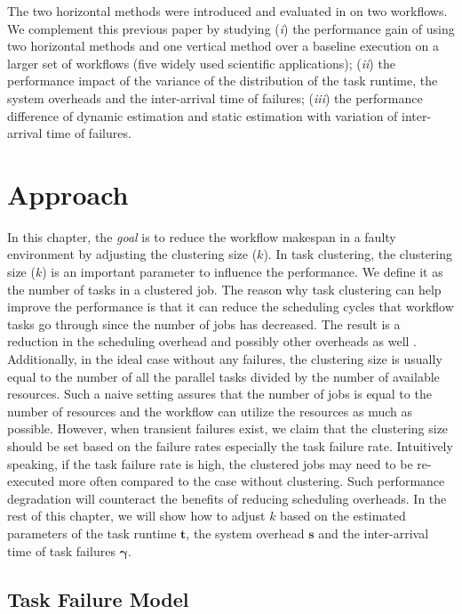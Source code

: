 The two horizontal methods were introduced and evaluated in \cite{Chen2012} on two workflows. We complement this previous paper by studying (\emph{i}) the performance gain of using two horizontal methods and one vertical method over a baseline execution on a larger set of workflows (five widely used scientific applications); (\emph{ii}) the performance impact of the variance of the distribution of the task runtime, the system overheads and the inter-arrival time of failures; (\emph{iii}) the performance difference of dynamic estimation and static estimation with variation of inter-arrival time of failures.  


\section{Approach}


In this chapter, the \emph{goal} is to reduce the workflow makespan in a faulty environment by adjusting the clustering size ($k$). In task clustering, the clustering size ($k$) is an important parameter to influence the performance. We define it as the number of tasks in a clustered job. The reason why task clustering can help improve the performance is that it can reduce the scheduling cycles that workflow tasks go through since the number of jobs has decreased. The result is a reduction in the scheduling overhead and possibly other overheads as well \cite{Chen2011}. Additionally, in the ideal case without any failures, the clustering size is usually equal to the number of all the parallel tasks divided by the number of available resources. Such a naive setting assures that the number of jobs is equal to the number of resources and the workflow can utilize the resources as much as possible. However, when transient failures exist, we claim that the clustering size should be set based on the failure rates especially the task failure rate. Intuitively speaking, if the task failure rate is high, the clustered jobs may need to be re-executed more often compared to the case without clustering. Such performance degradation will counteract the benefits of reducing scheduling overheads. In the rest of this chapter, we will show how to adjust $k$ based on the estimated parameters of the task runtime $\bm t$, the system overhead $\bm s$ and the inter-arrival time of task failures $\bm\gamma$. 

\subsection{Task Failure Model}

